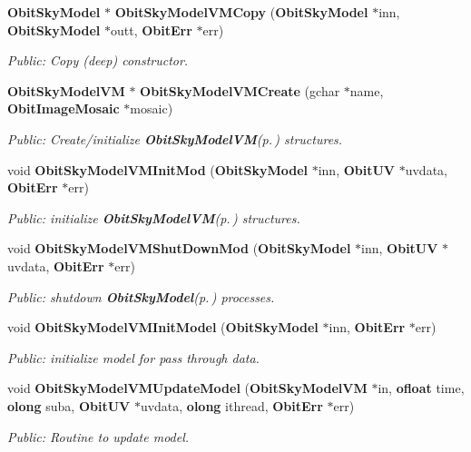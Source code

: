 \begin{CompactItemize}
{\bf Obit\-Sky\-Model} $\ast$ {\bf Obit\-Sky\-Model\-VMCopy} ({\bf Obit\-Sky\-Model} $\ast$inn, {\bf Obit\-Sky\-Model} $\ast$outt, {\bf Obit\-Err} $\ast$err)
\begin{CompactList}\small\item\em Public: Copy (deep) constructor. \item\end{CompactList}\item 
{\bf Obit\-Sky\-Model\-VM} $\ast$ {\bf Obit\-Sky\-Model\-VMCreate} (gchar $\ast$name, {\bf Obit\-Image\-Mosaic} $\ast$mosaic)
\begin{CompactList}\small\item\em Public: Create/initialize {\bf Obit\-Sky\-Model\-VM}{\rm (p.\,\pageref{structObitSkyModelVM})} structures. \item\end{CompactList}\item 
void {\bf Obit\-Sky\-Model\-VMInit\-Mod} ({\bf Obit\-Sky\-Model} $\ast$inn, {\bf Obit\-UV} $\ast$uvdata, {\bf Obit\-Err} $\ast$err)
\begin{CompactList}\small\item\em Public: initialize {\bf Obit\-Sky\-Model\-VM}{\rm (p.\,\pageref{structObitSkyModelVM})} structures. \item\end{CompactList}\item 
void {\bf Obit\-Sky\-Model\-VMShut\-Down\-Mod} ({\bf Obit\-Sky\-Model} $\ast$inn, {\bf Obit\-UV} $\ast$uvdata, {\bf Obit\-Err} $\ast$err)
\begin{CompactList}\small\item\em Public: shutdown {\bf Obit\-Sky\-Model}{\rm (p.\,\pageref{structObitSkyModel})} processes. \item\end{CompactList}\item 
void {\bf Obit\-Sky\-Model\-VMInit\-Model} ({\bf Obit\-Sky\-Model} $\ast$inn, {\bf Obit\-Err} $\ast$err)
\begin{CompactList}\small\item\em Public: initialize model for pass through data. \item\end{CompactList}\item 
void {\bf Obit\-Sky\-Model\-VMUpdate\-Model} ({\bf Obit\-Sky\-Model\-VM} $\ast$in, {\bf ofloat} time, {\bf olong} suba, {\bf Obit\-UV} $\ast$uvdata, {\bf olong} ithread, {\bf Obit\-Err} $\ast$err)
\begin{CompactList}\small\item\em Public: Routine to update model. \item\end{CompactList}\item 

\end{CompactItemize}
